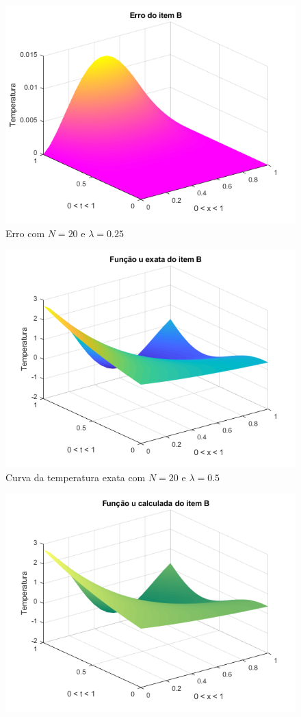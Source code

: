 \documentclass[12pt]{article}
\begin{document}
\begin{spacing}{1.5}
\begin{figure}
    \includegraphics[width=0.8\linewidth]{Primeira_Tarefa/ItemB/n20_lambda0-25_erro.png}
    \caption{Erro com $N=20$ e $\lambda=0.25$}
    \label{fig:B_n20lambda0-25_erro}
\end{figure}
\begin{figure}
    \centering
    \includegraphics[width=0.8\linewidth]{Primeira_Tarefa/ItemB/n20_lambda0-5_exata.png}
    \caption{Curva da temperatura exata com $N=20$ e $\lambda=0.5$}
    \label{fig:B_n20lambda0-5_exata}
\end{figure}
\begin{figure}
    \centering
    \includegraphics[width=0.8\linewidth]{Primeira_Tarefa/ItemB/n20_lambda0-5_calc.png}

\end{figure}
\end{spacing}
\end{document}
